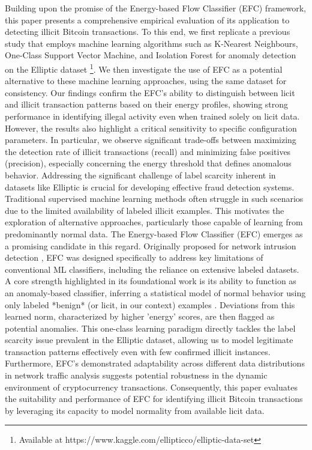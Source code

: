 \documentclass[12pt]{article}
\begin{document}
Building upon the promise of the Energy-based Flow Classifier (EFC) framework, this paper presents a comprehensive empirical
evaluation of its application to detecting illicit Bitcoin transactions. To this end, we first replicate a previous study
that employs machine learning algorithms such as K-Nearest Neighbours, One-Class Support Vector Machine, and Isolation
Forest for anomaly detection on the Elliptic dataset \footnote{Available at https://www.kaggle.com/ellipticco/elliptic-data-set}.
We then investigate the use of EFC as a potential alternative to these machine learning approaches, using the same dataset
for consistency. Our findings confirm the EFC's ability to distinguish between licit and illicit transaction patterns based
on their energy profiles, showing strong performance in identifying illegal activity even when trained solely on licit data.
However, the results also highlight a critical sensitivity to specific configuration parameters. In particular, we observe
significant trade-offs between maximizing the detection rate of illicit transactions (recall) and minimizing false positives
(precision), especially concerning the energy threshold that defines anomalous behavior. Addressing the significant challenge
of label scarcity inherent in datasets like Elliptic is crucial for developing effective fraud detection systems. Traditional
supervised machine learning methods often struggle in such scenarios due to the limited availability of labeled illicit
examples. This motivates the exploration of alternative approaches, particularly those capable of learning from predominantly
normal data. The Energy-based Flow Classifier (EFC) emerges as a promising candidate in this regard. Originally proposed
for network intrusion detection \cite{pontes2019, souza2022novelopensetenergybased}, EFC was designed specifically to
address key limitations of conventional ML classifiers, including the reliance on extensive labeled datasets. A core strength
highlighted in its foundational work is its ability to function as an anomaly-based classifier, inferring a statistical
model of normal behavior using only labeled *benign* (or licit, in our context) examples \cite{souza2022novelopensetenergybased}.
Deviations from this learned norm, characterized by higher 'energy' scores, are then flagged as potential anomalies.
This one-class learning paradigm directly tackles the label scarcity issue prevalent in the Elliptic dataset, allowing us
to model legitimate transaction patterns effectively even with few confirmed illicit instances. Furthermore, EFC's
demonstrated adaptability across different data distributions in network traffic analysis suggests potential robustness
in the dynamic environment of cryptocurrency transactions. Consequently, this paper evaluates the suitability and performance
of EFC for identifying illicit Bitcoin transactions by leveraging its capacity to model normality from available licit data.
\end{document}
